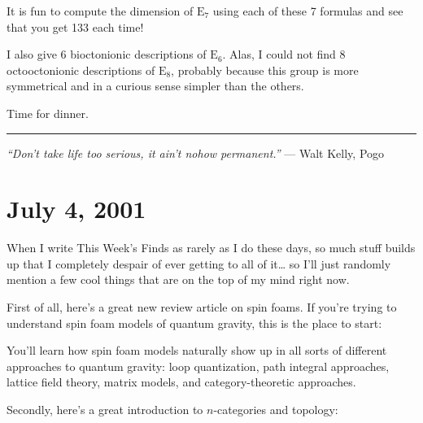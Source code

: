 \documentclass{article}
\def\tightlist{}
\renewcommand{\texttt}[1]{%
  \begingroup
  \ttfamily
  \begingroup\lccode`~=`/\lowercase{\endgroup\def~}{/\discretionary{}{}{}}%
  \begingroup\lccode`~=`[\lowercase{\endgroup\def~}{[\discretionary{}{}{}}%
  \begingroup\lccode`~=`.\lowercase{\endgroup\def~}{.\discretionary{}{}{}}%
  \catcode`/=\active\catcode`[=\active\catcode`.=\active
  \scantokens{#1\noexpand}%
  \endgroup
}
\begin{document}
It is fun to compute the dimension of \(\mathrm{E}_7\) using each of
these 7 formulas and see that you get 133 each time!

I also give 6 bioctonionic descriptions of \(\mathrm{E}_6\). Alas, I
could not find 8 octooctonionic descriptions of \(\mathrm{E}_8\),
probably because this group is more symmetrical and in a curious sense
simpler than the others.

Time for dinner.

\begin{center}\rule{0.5\linewidth}{0.5pt}\end{center}

\emph{``Don't take life too serious, it ain't nohow permanent.''} ---
Walt Kelly, Pogo



\hypertarget{week169}{%
\section{July 4, 2001}\label{week169}}

When I write This Week's Finds as rarely as I do these days, so much
stuff builds up that I completely despair of ever getting to all of
it\ldots{} so I'll just randomly mention a few cool things that are on
the top of my mind right now.

First of all, here's a great new review article on spin foams. If you're
trying to understand spin foam models of quantum gravity, this is the
place to start:


You'll learn how spin foam models naturally show up in all sorts of
different approaches to quantum gravity: loop quantization, path
integral approaches, lattice field theory, matrix models, and
category-theoretic approaches.

Secondly, here's a great introduction to \(n\)-categories and topology:

\end{document}
